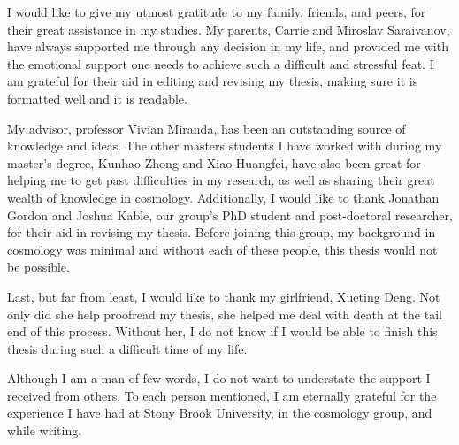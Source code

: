 \documentclass[master,bottom,nosig]{usbthesis}
\theoremstyle{definition}
\theoremstyle{plain} %
\begin{document}
\begin{acknowledgements}
I would like to give my utmost gratitude to my family, friends, and peers, for their great assistance in my studies. My parents, Carrie and Miroslav Saraivanov, have always supported me through any decision in my life, and provided me with the emotional support one needs to achieve such a difficult and stressful feat. I am grateful for their aid in editing and revising my thesis, making sure it is formatted well and it is readable. 

My advisor, professor Vivian Miranda, has been an outstanding source of knowledge and ideas. The other masters students I have worked with during my master’s degree, Kunhao Zhong and Xiao Huangfei, have also been great for helping me to get past difficulties in my research, as well as sharing their great wealth of knowledge in cosmology. Additionally, I would like to thank Jonathan Gordon and Joshua Kable, our group's PhD student and post-doctoral researcher, for their aid in revising my thesis. Before joining this group, my background in cosmology was minimal and without each of these people, this thesis would not be possible.

Last, but far from least, I would like to thank my girlfriend, Xueting Deng. Not only did she help proofread my thesis, she helped me deal with death at the tail end of this process. Without her, I do not know if I would be able to finish this thesis during such a difficult time of my life.

Although I am a man of few words, I do not want to understate the support I received from others. To each person mentioned, I am eternally grateful for the experience I have had at Stony Brook University, in the cosmology group, and while writing.
\end{acknowledgements}
\pagestyle{thesis}
\newpage
{}







{}
\renewcommand{\baselinestretch}{1}
\normalsize

\clearpage
\newpage
{}%


\clearpage
\newpage

\appendix

%
\end{document}
